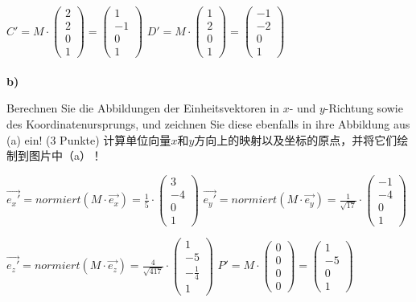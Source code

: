 \documentclass[fleqn]{article}
\begin{document}
$C' = M\cdot\begin{pmatrix} 2 \\ 2 \\ 0 \\ 1 \end{pmatrix} =\begin{pmatrix} 1 \\ -1 \\ 0 \\ 1 \end{pmatrix} $
\qquad$D' = M\cdot\begin{pmatrix} 1 \\ 2 \\ 0 \\ 1 \end{pmatrix} =\begin{pmatrix} -1 \\ -2 \\ 0 \\ 1 \end{pmatrix} $
\\
\\
\textbf{b)} 

Berechnen Sie die Abbildungen der Einheitsvektoren in $x$- und $y$-Richtung sowie des Koordinatenursprungs, und zeichnen Sie diese ebenfalls in ihre Abbildung aus (a) ein! (3 Punkte)
计算单位向量$x$和$y$方向上的映射以及坐标的原点，并将它们绘制到图片中（a）！

$\vec{e_{x}'} = normiert(M\cdot \vec{e_{x}}) = \frac{1}{5}\cdot \begin{pmatrix} 3 \\ -4 \\ 0 \\ 1 \end{pmatrix}$
\qquad$\vec{e_{y}'} = normiert(M\cdot \vec{e_{y}}) = \frac{1}{\sqrt{17}}\cdot \begin{pmatrix} -1 \\ -4 \\ 0 \\ 1 \end{pmatrix}$

$\vec{e_{z}'} = normiert(M\cdot \vec{e_{z}}) = \frac{4}{\sqrt{417}}\cdot \begin{pmatrix} 1 \\ -5 \\ -\frac{1}{4} \\ 1 \end{pmatrix}$
\qquad$P' = M\cdot \begin{pmatrix} 0 \\ 0 \\ 0 \\ 0 \end{pmatrix} = \begin{pmatrix} 1 \\ -5 \\ 0 \\ 1 \end{pmatrix}$
\end{document}
